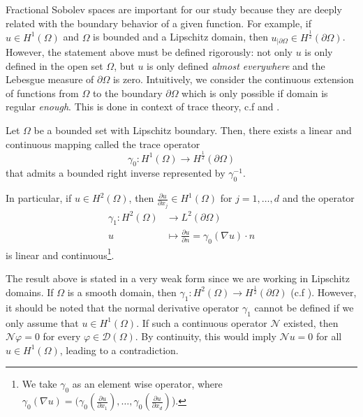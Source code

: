 Fractional Sobolev spaces are important for our study because they are deeply related with the boundary behavior of a given function. For example, if \(u \in H^1(\Omega)\) and \(\Omega\) is bounded and a Lipschitz domain, then \(u_{|\partial\Omega} \in H^\frac{1}{2}(\partial\Omega)\). However, the statement above must be defined rigorously: not only \(u\) is only defined in the open set \(\Omega\), but \(u\) is only defined \textit{almost everywhere} and the Lebesgue measure of \(\partial\Omega\) is zero. Intuitively, we consider the continuous extension of functions from \(\Omega\) to the boundary \(\partial\Omega\) which is only possible if domain is regular \textit{enough}. This is done in context of trace theory, c.f \cite{geymonat2007trace} and \cite{necas2011direct}.
\begin{theorem}\label{frac_theo}
    Let \(\Omega\) be a bounded set with Lipschitz boundary. Then, there exists a linear and continuous mapping called the trace operator
    \[
    \gamma_0: H^1(\Omega) \rightarrow H^{\frac{1}{2}}(\partial\Omega)    
    \]
    that admits a bounded right inverse represented by \(\gamma_0^{-1}\).

    In particular, if \(u \in H^2(\Omega)\), then \(\frac{\partial u}{\partial x_j} \in H^1(\Omega)\) for \(j=1,\dots,d\) and the operator
    \begin{align*}
        \gamma_1: H^2(\Omega) &\rightarrow L^2(\partial\Omega)\\
        u &\mapsto \frac{\partial u}{\partial n} = \gamma_0(\nabla u)\cdot n
    \end{align*}
    is linear and continuous\footnote{We take \(\gamma_0\) as an element wise operator, where \(\gamma_0(\nabla u) = \Big(\gamma_0(\frac{\partial u}{\partial x_1}),\dots,\gamma_0(\frac{\partial u}{\partial x_d})\)\Big).}.  
\end{theorem}
The result above is stated in a very weak form since we are working in Lipschitz domains. If $\Omega$ is a smooth domain, then $\gamma_1: H^2(\Omega) \rightarrow H^{\frac{1}{2}}(\partial\Omega)$ (c.f \cite{lions2012non}). However, it should be noted that the normal derivative operator $\gamma_1$ cannot be defined if we only assume that $u \in H^1(\Omega)$. If such a continuous operator $\mathcal{N}$ existed, then $\mathcal{N}\varphi = 0$ for every $\varphi \in \mathcal{D}(\Omega)$. By continuity, this would imply $\mathcal{N}u=0$ for all $u \in H^1(\Omega)$, leading to a contradiction.

